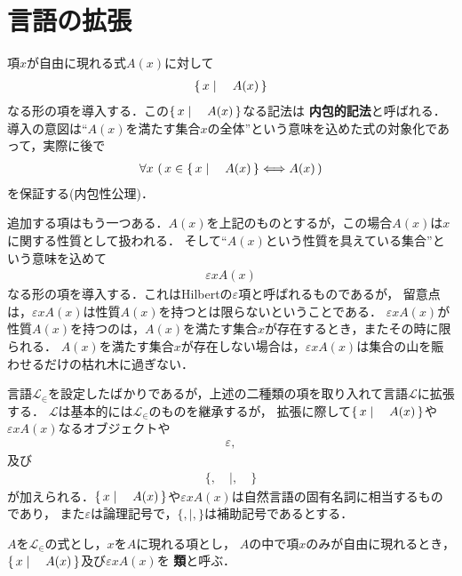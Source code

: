 \section{言語の拡張}
	項$x$が自由に現れる式$A(x)$に対して
	\begin{align}
		\left\{\, x \mid \quad A(x)\, \right\}
	\end{align}
	なる形の項を導入する．この$\left\{\, x \mid \quad A(x)\, \right\}$なる記法は
	{\bf 内包的記法}と呼ばれる．
	導入の意図は``$A(x)$を満たす集合$x$の全体''という意味を込めた式の対象化であって，実際に後で
	\begin{align}
		\forall x\, \left(\, x \in \left\{\, x \mid \quad A(x)\, \right\} \Longleftrightarrow A(x)\, \right)
	\end{align}
	を保証する(内包性公理)．
	
	追加する項はもう一つある．$A(x)$を上記のものとするが，この場合$A(x)$は$x$に関する性質として扱われる．
	そして``$A(x)$という性質を具えている集合''という意味を込めて
	\begin{align}
		\varepsilon x A(x)
	\end{align}
	なる形の項を導入する．これはHilbertの$\varepsilon$項と呼ばれるものであるが，
	留意点は，$\varepsilon x A(x)$は性質$A(x)$を持つとは限らないということである．
	$\varepsilon x A(x)$が性質$A(x)$を持つのは，$A(x)$を満たす集合$x$が存在するとき，またその時に限られる．
	$A(x)$を満たす集合$x$が存在しない場合は，$\varepsilon x A(x)$は集合の山を賑わせるだけの枯れ木に過ぎない．
	
	言語$\mathcal{L}_{\in}$を設定したばかりであるが，上述の二種類の項を取り入れて言語$\mathcal{L}$に拡張する．
	$\mathcal{L}$は基本的には$\mathcal{L}_{\in}$のものを継承するが，
	拡張に際して$\left\{\, x \mid \quad A(x)\, \right\}$や$\varepsilon x A(x)$なるオブジェクトや
	\begin{align}
		\varepsilon,
	\end{align}
	及び
	\begin{align}
		\{, \quad |, \quad \}
	\end{align}
	が加えられる．$\left\{\, x \mid \quad A(x)\, \right\}$や$\varepsilon x A(x)$は自然言語の固有名詞に相当するものであり，
	また$\varepsilon$は論理記号で，$\{,|,\}$は補助記号であるとする．
	
	\begin{screen}
		\begin{dfn}[類]
			$A$を$\mathcal{L}_{\in}$の式とし，$x$を$A$に現れる項とし，
			$A$の中で項$x$のみが自由に現れるとき，
			$\left\{\, x \mid \quad A(x)\, \right\}$及び$\varepsilon x A(x)$を
			{\bf 類}と呼ぶ．
		\end{dfn}
	\end{screen}
	
